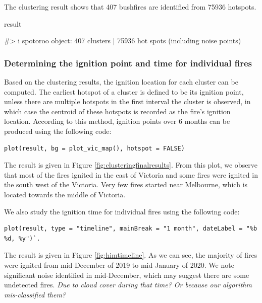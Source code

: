 The clustering result shows that 407 bushfires are identified from 75936
hotspots.

\begin{Schunk}
\begin{Sinput}
result
\end{Sinput}
\begin{Soutput}
#> i spotoroo object: 407 clusters | 75936 hot spots (including noise points)
\end{Soutput}
\end{Schunk}

\hypertarget{determining-the-ignition-point-and-time-for-individual-fires}{%
\subsubsection{Determining the ignition point and time for individual
fires}\label{determining-the-ignition-point-and-time-for-individual-fires}}

Based on the clustering results, the ignition location for each cluster
can be computed. The earliest hotspot of a cluster is defined to be its
ignition point, unless there are multiple hotspots in the first interval
the cluster is observed, in which case the centroid of these hotspots is
recorded as the fire's ignition location. According to this method,
ignition points over 6 months can be produced using the following code:

\begin{verbatim}
plot(result, bg = plot_vic_map(), hotspot = FALSE)
\end{verbatim}

The result is given in Figure \ref{fig:clusteringfinalresults}. From
this plot, we observe that most of the fires ignited in the east of
Victoria and some fires were ignited in the south west of the Victoria.
Very few fires started near Melbourne, which is located towards the
middle of Victoria.

We also study the ignition time for individual fires using the following
code:

\begin{verbatim}
plot(result, type = "timeline", mainBreak = "1 month", dateLabel = "%b %d, %y")`. 
\end{verbatim}

The result is given in Figure \ref{fig:himtimeline}. As we can see, the
majority of fires were ignited from mid-December of 2019 to mid-January
of 2020. We note significant noise identified in mid-December, which may
suggest there are some undetected fires.
\textit{Due to cloud cover during that time? Or because our algorithm mis-classified them?}

